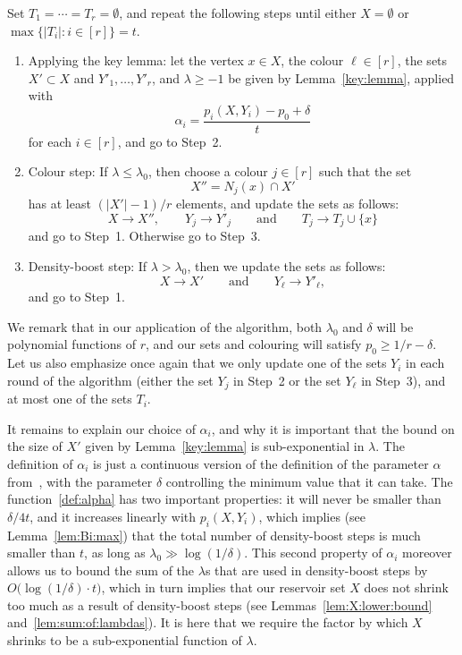 \begin{RBalg}
Set $T_1 = \cdots = T_r = \emptyset$, and repeat the following steps until either $X = \emptyset$ or $\max\big\{ |T_i| : i \in [r] \big\} = t$. 
\begin{enumerate}[label=\arabic*., ref=\arabic*] 
\item\label{Alg:Step1} Applying the key lemma: let the vertex $x \in X$, the colour $\ell \in [r]$, the sets $X' \subset X$ and $Y'_1,\ldots,Y'_r$, and $\lambda \ge -1$ be given by Lemma~\ref{key:lemma}, applied with
\begin{equation}\label{def:alpha}
\alpha_i = \frac{p_i(X,Y_i) - p_0 + \delta}{t}
\end{equation}
for each $i \in [r]$, and go to Step~2.\smallskip
\item\label{Alg:Step2} Colour step: If $\lambda \le \lambda_0$, then choose a colour $j \in [r]$ such that the set
$$X'' = N_j(x) \cap X'$$ 
has at least $(|X'| - 1)/r$ elements, and update the sets as follows:
$$X \to X'', \qquad Y_j \to Y'_j \qquad \text{and} \qquad T_j \to T_j \cup \{x\}$$
and go to Step~1. Otherwise go to Step~3.\smallskip
\item\label{Alg:Step3} Density-boost step: If $\lambda > \lambda_0$, then we update the sets as follows:
$$X \to X' \qquad \text{and} \qquad Y_\ell \to Y'_\ell,$$
and go to Step~1.
\end{enumerate}  
\end{RBalg} 

We remark that in our application of the algorithm, both $\lambda_0$ and $\delta$ will be polynomial functions of $r$, and our sets and colouring will satisfy $p_0 \ge 1/r - \delta$. Let us also emphasize once again that we only update one of the sets $Y_i$ in each round of the algorithm (either the set $Y_j$ in Step~2 or the set $Y_\ell$ in Step~3), and at most one of the sets $T_i$. 

It remains to explain our choice of $\alpha_i$, and why it is important that the bound on the size of $X'$ given by Lemma~\ref{key:lemma} is sub-exponential in $\lambda$. The definition of $\alpha_i$ is just a continuous version of the definition of the parameter $\alpha$ from~\cite{CGMS}, with the parameter $\delta$ controlling the minimum value that it can take. The function~\eqref{def:alpha} has two important properties: it will never be smaller than $\delta / 4t$, and it increases linearly with $p_i(X,Y_i)$, which implies (see Lemma~\ref{lem:Bi:max}) that the total number of density-boost steps is much smaller than $t$, as long as $\lambda_0 \gg \log(1/\delta)$. This second property of $\alpha_i$ moreover allows us to bound the sum of the $\lambda$s that are used in density-boost steps by $O\big( \log(1/\delta) \cdot t \big)$, which in turn implies that our reservoir set $X$ does not shrink too much as a result of density-boost steps (see Lemmas~\ref{lem:X:lower:bound} and~\ref{lem:sum:of:lambdas}). It is here that we require the factor by which $X$ shrinks to be a sub-exponential function of $\lambda$.